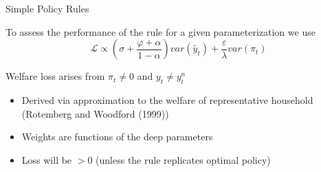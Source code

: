 
	
\begin{frame}{Simple Policy Rules}

To assess the performance of the rule for a given parameterization we use
\[
\mathcal{L} \propto \left( \sigma + \frac{\varphi + \alpha}{1-\alpha} \right) var(\tilde{y_{t}}) + \frac{\varepsilon}{\lambda} var(\pi_{t})
\]

Welfare loss arises from $\pi_{t}\neq0$ and $y_{t}\neq y^{n}_{t}$
\begin{itemize}
\item	Derived via approximation to the welfare of representative household (Rotemberg and Woodford (1999))
\item	Weights are functions of the deep parameters
\item	Loss will be $>0$ (unless the rule replicates optimal policy)
\end{itemize}


\end{frame}


	
